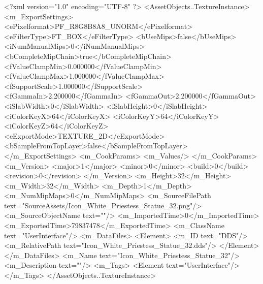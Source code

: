 <?xml version="1.0" encoding="UTF-8" ?>
<AssetObjects..TextureInstance>
	<m_ExportSettings>
		<ePixelformat>PF_R8G8B8A8_UNORM</ePixelformat>
		<eFilterType>FT_BOX</eFilterType>
		<bUseMips>false</bUseMips>
		<iNumManualMips>0</iNumManualMips>
		<bCompleteMipChain>true</bCompleteMipChain>
		<fValueClampMin>0.000000</fValueClampMin>
		<fValueClampMax>1.000000</fValueClampMax>
		<fSupportScale>1.000000</fSupportScale>
		<fGammaIn>2.200000</fGammaIn>
		<fGammaOut>2.200000</fGammaOut>
		<iSlabWidth>0</iSlabWidth>
		<iSlabHeight>0</iSlabHeight>
		<iColorKeyX>64</iColorKeyX>
		<iColorKeyY>64</iColorKeyY>
		<iColorKeyZ>64</iColorKeyZ>
		<eExportMode>TEXTURE_2D</eExportMode>
		<bSampleFromTopLayer>false</bSampleFromTopLayer>
	</m_ExportSettings>
	<m_CookParams>
		<m_Values/>
	</m_CookParams>
	<m_Version>
		<major>1</major>
		<minor>0</minor>
		<build>0</build>
		<revision>0</revision>
	</m_Version>
	<m_Height>32</m_Height>
	<m_Width>32</m_Width>
	<m_Depth>1</m_Depth>
	<m_NumMipMaps>0</m_NumMipMaps>
	<m_SourceFilePath text="SourceAssets/Icon_White_Priestess_Statue_32.png"/>
	<m_SourceObjectName text=""/>
	<m_ImportedTime>0</m_ImportedTime>
	<m_ExportedTime>79837478</m_ExportedTime>
	<m_ClassName text="UserInterface"/>
	<m_DataFiles>
		<Element>
			<m_ID text="DDS"/>
			<m_RelativePath text="Icon_White_Priestess_Statue_32.dds"/>
		</Element>
	</m_DataFiles>
	<m_Name text="Icon_White_Priestess_Statue_32"/>
	<m_Description text=""/>
	<m_Tags>
		<Element text="UserInterface"/>
	</m_Tags>
</AssetObjects..TextureInstance>

